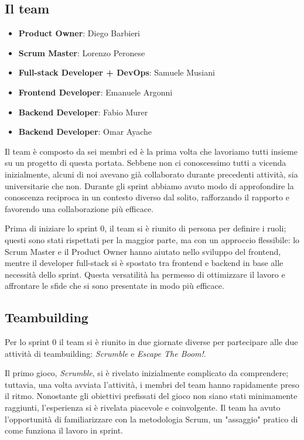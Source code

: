 \documentclass{article}
\begin{document}
\subsection{Il team}

\begin{itemize}
    \item \textbf{Product Owner}: Diego Barbieri
    \item \textbf{Scrum Master}: Lorenzo Peronese
    \item \textbf{Full-stack Developer + DevOps}: Samuele Musiani
    \item \textbf{Frontend Developer}: Emanuele Argonni
    \item \textbf{Backend Developer}: Fabio Murer
    \item \textbf{Backend Developer}: Omar Ayache
\end{itemize}

Il team è composto da sei membri ed è la prima volta che lavoriamo tutti insieme su un progetto di questa portata. Sebbene non ci 
conoscessimo tutti a vicenda inizialmente, alcuni di noi avevano già collaborato durante precedenti attività, sia universitarie 
che non. Durante gli sprint abbiamo avuto modo di approfondire la conoscenza reciproca in un contesto diverso dal solito, rafforzando 
il rapporto e favorendo una collaborazione più efficace.

Prima di iniziare lo sprint 0, il team si è riunito di persona per definire i ruoli; questi sono stati rispettati per la maggior parte, 
ma con un approccio flessibile: lo Scrum Master e il Product Owner hanno aiutato nello sviluppo del frontend, mentre il developer full-stack
si è spostato tra frontend e backend in base alle necessità dello sprint. Questa versatilità ha permesso di ottimizzare il lavoro 
e affrontare le sfide che si sono presentate in modo più efficace.

\subsection{Teambuilding} \label{sec:teambuilding}

Per lo sprint 0 il team si è riunito in due giornate diverse per partecipare alle due attività di teambuilding: \textit{Scrumble} e 
\textit{Escape The Boom!}.

Il primo gioco, \textit{Scrumble}, si è rivelato inizialmente complicato da comprendere; tuttavia, una volta avviata l'attività, i membri 
del team hanno rapidamente preso il ritmo. Nonostante gli obiettivi prefissati del gioco non siano stati minimamente raggiunti, l'esperienza 
si è rivelata piacevole e coinvolgente. Il team ha avuto l'opportunità di familiarizzare con la metodologia Scrum, un "assaggio" pratico 
di come funziona il lavoro in sprint.
\end{document}
